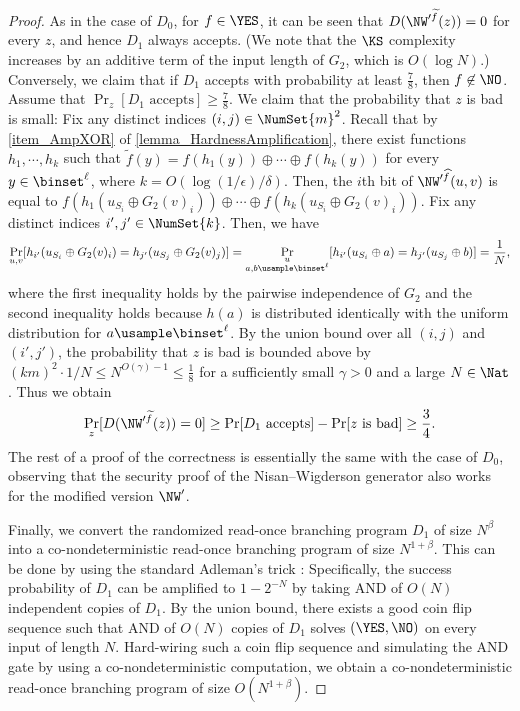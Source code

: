 \documentclass[11pt]{article}
\numberwithin{equation}{section}
\theoremstyle{definition}
\theoremstyle{plain}
\begin{document}
\begin{proof}
  As in the case of $D_0$, for $f \in \YES$, it can be seen that $D(\NW'^{\widetilde{f}}(z)) = 0$ for every $z$, and hence $D_1$ always accepts.
  (We note that the $\KS$ complexity increases by an additive term of the input length of $G_2$, which is $O(\log N)$.)
  Conversely, we claim that if $D_1$ accepts with probability at least $\frac{7}{8}$, then $f \not\in \NO$.
  Assume that $\Pr_{z} [ \text{$D_1$ accepts} ] \ge \frac{7}{8}$.
  We claim that the probability that $z$ is bad is small:
  Fix any distinct indices $(i, j) \in \NumSet{m}^2$.
  Recall that by \cref{item_AmpXOR} of \cref{lemma_HardnessAmplification},
  there exist functions $h_1, \cdots, h_k$ such that
  $
    \widetilde{f}(y) =
    f(h_1(y)) \oplus \cdots \oplus f(h_k(y))$
  for every $y \in \binset^\ell$,
  where $k = O(\log(1/\epsilon) / \delta)$.
  Then, the $i$th bit of $\NW'^{\widehat{f}}(u, v)$ is equal to
  $f(h_1(u_{S_i} \oplus G_2(v)_i))
    \oplus \cdots \oplus f(h_k(u_{S_i} \oplus G_2(v)_i)).
  $
  Fix any distinct indices $i', j' \in \NumSet{k}$.
  Then, we have
  \begin{align*}
    \Pr_{u, v}[h_{i'}(u_{S_i} \oplus G_2(v)_i)
      = h_{j'}(u_{S_j} \oplus G_2(v)_j)]
    = \Pr_{\substack{u \\ a, b \usample \binset^\ell}}[h_{i'}(u_{S_i} \oplus a) = h_{j'}(u_{S_j} \oplus b)]
    = \frac{1}{N},
  \end{align*}
  where the first inequality holds by the pairwise independence of $G_2$
  and the second inequality holds because $h(a)$ is distributed identically with the uniform distribution for $a \usample \binset^\ell$.
  By the union bound over all $(i, j)$ and $(i', j')$,
  the probability that $z$ is bad is bounded above by $(km)^2 \cdot 1/N \le N^{O(\gamma) - 1} \le \frac{1}{8}$ for a sufficiently small $\gamma > 0$ and a large $N \in \Nat$.
  Thus we obtain
  \begin{align*}
    \Pr_z [ D(\NW'^{\widetilde{f}}(z)) = 0 ]
    \ge
    \Pr [ \text{$D_1$ accepts} ] - \Pr [ \text{$z$ is bad} ] \ge \frac{3}{4}.
  \end{align*}
  The rest of a proof of the correctness is essentially the same with the case of $D_0$,
  observing that the security proof of the Nisan--Wigderson generator also works for the modified version $\NW'$.

  Finally, we convert the randomized read-once branching program $D_1$ of size $N^\beta$
  into a co-nondeterministic read-once branching program of size $N^{1 + \beta}$.
  This can be done by using the standard Adleman's trick \cite{Adleman78_focs_conf}:
  Specifically, the success probability of $D_1$ can be amplified to $1 - 2^{-N}$ by taking AND of $O(N)$ independent copies of $D_1$.
  By the union bound, there exists a good coin flip sequence such that
  AND of $O(N)$ copies of $D_1$ solves $(\YES, \NO)$ on every input of length $N$.
  Hard-wiring such a coin flip sequence and simulating the AND gate by using a co-nondeterministic computation,
  we obtain a co-nondeterministic read-once branching program of size $O(N^{1 + \beta})$.
\end{proof}
\end{document}
